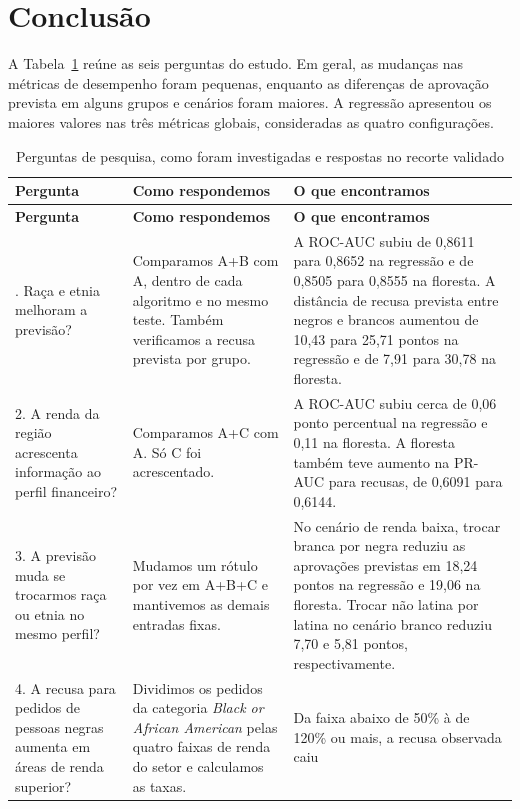 \documentclass[12pt]{article}
\begin{document}
\section{Conclusão}

A Tabela~\ref{tab:perguntas} reúne as seis perguntas do estudo.
Em geral, as mudanças nas métricas de desempenho foram pequenas,
enquanto as diferenças de aprovação prevista em alguns grupos e
cenários foram maiores. A regressão apresentou os maiores valores
nas três métricas globais, consideradas as quatro configurações.

\begingroup
\small
\setlength{\tabcolsep}{4pt}
\begin{longtable}{@{}p{.21\linewidth}p{.27\linewidth}p{.47\linewidth}@{}}
\caption{Perguntas de pesquisa, como foram investigadas e respostas no recorte validado}
\label{tab:perguntas}\\
\hline
\textbf{Pergunta} & \textbf{Como respondemos} & \textbf{O que encontramos} \\
\hline
\endfirsthead
\hline
\textbf{Pergunta} & \textbf{Como respondemos} & \textbf{O que encontramos} \\
\hline
\endhead
\hline
\endfoot
1. Raça e etnia melhoram a previsão? &
Comparamos A+B com A, dentro de cada algoritmo e no mesmo teste.
Também verificamos a recusa prevista por grupo. &
A ROC-AUC subiu de 0,8611 para 0,8652 na regressão e de 0,8505
para 0,8555 na floresta. A distância de recusa prevista entre negros
e brancos aumentou de 10,43 para 25,71 pontos na regressão e de 7,91
para 30,78 na floresta. \\[4pt]
2. A renda da região acrescenta informação ao perfil financeiro? &
Comparamos A+C com A. Só C foi acrescentado. &
A ROC-AUC subiu cerca de 0,06 ponto percentual na regressão e
0,11 na floresta. A floresta também teve aumento na PR-AUC para
recusas, de 0,6091 para 0,6144. \\[4pt]
3. A previsão muda se trocarmos raça ou etnia no mesmo perfil? &
Mudamos um rótulo por vez em A+B+C e mantivemos as demais entradas fixas. &
No cenário de renda baixa, trocar branca por negra reduziu as
aprovações previstas em 18,24 pontos na regressão e 19,06 na floresta.
Trocar não latina por latina no cenário branco reduziu 7,70 e
5,81 pontos, respectivamente. \\[4pt]
4. A recusa para pedidos de pessoas negras aumenta em áreas de renda superior? &
Dividimos os pedidos da categoria \textit{Black or African American}
pelas quatro faixas de renda do setor e calculamos as taxas. &
Da faixa abaixo de 50\% à de 120\% ou mais, a recusa observada caiu

\end{longtable}
\end{document}

